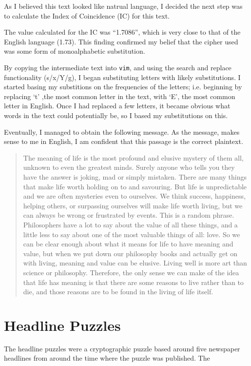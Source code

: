 \documentclass[11pt,a4paper,twoside]{article}
\begin{document}
As I believed this text looked like natrual language, I decided the next step was
to calculate the Index of Coincidence (IC) for this text. 

The value calculated for the IC was ``1.7086'', which is very close to that of
the English language (1.73). This finding confirmed my belief that the cipher
used was some form of monoalphabetic substitution.  

By copying the intermediate text into {\tt vim}, and using the search and
replace functionality (s/x/Y/g), I began substituting letters with likely
substitutions. I started basing my substitions on the frequencies of the
letters; i.e. beginning by replacing `t' ,the most common letter in the text,
with `E', the most common letter in English. Once I had replaced a few letters,
it became obvious what words in the text could potentially be, so I based my
substitutions on this. 

Eventually, I managed to obtain the following message. As the message, makes
sense to me in English, I am confident that this passage is the correct
plaintext. 

\begin{quote}
\small
\raggedright
The meaning of life is the most profound and elusive mystery of them all,
unknown to even the greatest minds. Surely anyone who tells you they have the
answer is joking, mad or simply mistaken.  There are many things that make life
worth holding on to and savouring. But life is unpredictable and we are often
mysteries even to ourselves. We think success, happiness, helping others, or
surpassing ourselves will make life worth living, but we can always be wrong or
frustrated by events.  This is a random phrase.  Philosophers have a lot to say
about the value of all these things, and a little less to say about one of the
most valuable things of all: love. So we can be clear enough about what it
means for life to have meaning and value, but when we put down our philosophy
books and actually get on with living, meaning and value can be elusive. Living
well is more art than science or philosophy. Therefore,  the only sense we can
make of the idea that life has meaning is that there are some reasons to live
rather than to die, and those reasons are to be found in the living of life
itself.
\end{quote}

\vfill
\pagebreak
\section{Headline Puzzles}
The headline puzzles were a cryptographic puzzle based around five newspaper
headlines from around the time where the puzzle was published. The 
\end{document}
